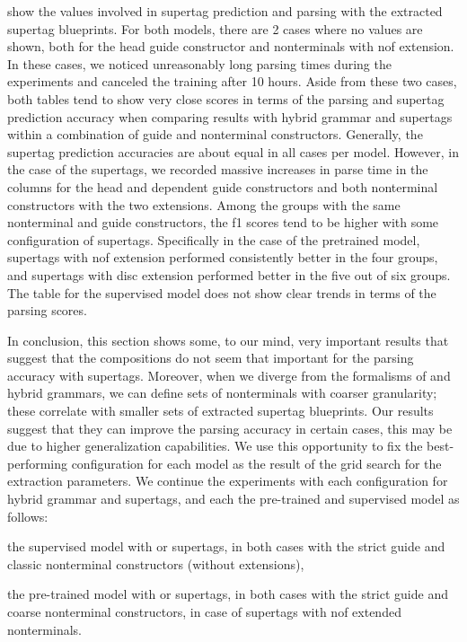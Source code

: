 \documentclass[../../document.tex]{subfiles}
\begin{document}
     show the values involved in supertag prediction and parsing with the extracted supertag blueprints.
    For both models, there are 2 cases where no values are shown, both for the head guide constructor and nonterminals with nof extension.
    In these cases, we noticed unreasonably long parsing times during the experiments and canceled the training after 10 hours.
    Aside from these two cases, both tables tend to show very close scores in terms of the parsing and supertag prediction accuracy when comparing results with hybrid grammar and  supertags within a combination of guide and nonterminal constructors.
    Generally, the supertag prediction accuracies are about equal in all cases per model.
    However, in the case of the  supertags, we recorded massive increases in parse time in the columns for the head and dependent guide constructors and both nonterminal constructors with the two extensions.
    Among the groups with the same nonterminal and guide constructors, the f1 scores tend to be higher with some configuration of  supertags.
    Specifically in the case of the pretrained model,  supertags with nof extension performed consistently better in the four groups, and  supertags with disc extension performed better in the five out of six groups.
    The table for the supervised model does not show clear trends in terms of the parsing scores.

    In conclusion, this section shows some, to our mind, very important results that suggest that the  compositions do not seem that important for the parsing accuracy with supertags.
    Moreover, when we diverge from the formalisms of  and hybrid grammars, we can define sets of nonterminals with coarser granularity; these correlate with smaller sets of extracted supertag blueprints.
    Our results suggest that they can improve the parsing accuracy in certain cases, this may be due to higher generalization capabilities.
    We use this opportunity to fix the best-performing configuration for each model as the result of the grid search for the extraction parameters.
    We continue the experiments with each configuration for hybrid grammar and  supertags, and each the pre-trained and supervised model as follows:
    \begin{compactenum}
        \item the supervised model with  or  supertags, in both cases with the strict guide and classic nonterminal constructors (without extensions),
        \item the pre-trained model with  or  supertags, in both cases with the strict guide and coarse nonterminal constructors, in case of  supertags with nof extended nonterminals.
    \end{compactenum}
\end{document}
